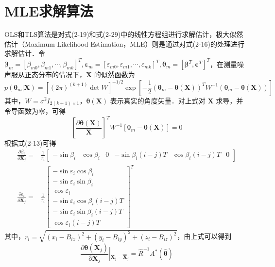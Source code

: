 \section{MLE求解算法}
OLS和TLS算法是对式(2-19)和式(2-29)中的线性方程组进行求解估计，极大似然估计（Maximum Likelihood Estimation，MLE）则是通过对式(2-16)的处理进行求解估计．令$\bm{\beta}_m=[\beta_{m0},\beta_{m1},\cdots,\beta_{mk}]^T,\bm{\varepsilon}_m = [\varepsilon_{m0},\varepsilon_{m1},\cdots,\varepsilon_{mk}]^T,\bm{\theta}_m = [\bm{\beta}^T,\bm{\varepsilon}^T]^T$，在测量噪声服从正态分布的情况下，$\bm{X}$ 的似然函数为
\begin{equation}
	p(\bm{\theta}_m|\bm{X}) = [(2\pi)^{(k+1)}\det W]^{-1/2}\exp[-\frac{1}{2}(\bm{\theta}_m-\bm{\theta}(\bm{X}))^T W^{-1}(\bm{\theta}_m-\bm{\theta}(\bm{X}))]
\end{equation}
其中，$W=\sigma^2 I_{2(k+1)\times 1}$，$\bm{\theta}(\bm{X})$ 表示真实的角度矢量．对上式对 $\bm{X}$ 求导，并令导函数为零，可得
\begin{equation}
	\left[\frac{\partial \bm{\theta}(\bm{X})}{\bm{X}}\right]^T W^{-1}[\bm{\theta}_m - \bm{\theta}(\bm{X})] = 0
\end{equation}
根据式(2-13)可得
\begin{equation}
	\begin{split}
		\frac{\partial \beta_i}{\partial \bm{X}_j} =& \frac{1}{r_i}\left[\begin{array}{cccccc}
			-\sin\beta_i & \cos\beta_i & 0 & -\sin\beta_i(i-j)T & \cos\beta_i(i-j)T & 0
		\end{array}\right] \\
	\frac{\partial \varepsilon_i}{\partial \bm{X}_j} =& \frac{1}{r_i}\left[\begin{array}{c}
		-\sin\varepsilon_i \cos\beta_i \\ -\sin\varepsilon_i \sin\beta_i \\ \cos\varepsilon_i \\ -\sin\varepsilon_i\cos\beta_i(i-j)T \\ -\sin\varepsilon_i\sin\beta_i (i-j)T \\ \cos\varepsilon_i(i-j)T
	\end{array}\right]^T
	\end{split}
\end{equation}
其中，$r_i=\sqrt{(x_i-B_{ix})^2 + (y_i - B_{iy})^2 + (z_i - B_{iz})^2}$，由上式可以得到
\begin{equation}
	\frac{\partial \bm{\theta}(\bm{X}_j)}{\partial \bm{X}_j} \left|_{\bm{X}_j = \hat{\bm{X}}_j} \right.= \hat{R}^{-1} A^*(\hat{\bm{\theta}})
\end{equation} 
